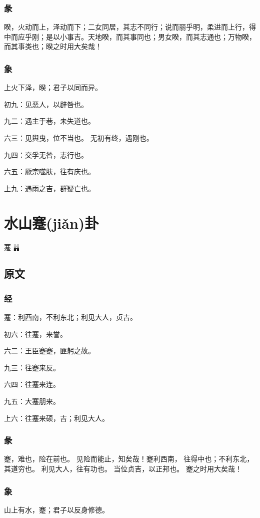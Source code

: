 \documentclass[12pt,oneside]{book}
\begin{document}
\subsection{彖}
睽，火动而上，泽动而下；二女同居，其志不同行；说而丽乎明，柔进而上行，得中而应乎刚；是以小事吉。天地睽，而其事同也；男女睽，而其志通也；万物睽，而其事类也；睽之时用大矣哉！

\subsection{象}
上火下泽，睽；君子以同而异。

初九：见恶人，以辟咎也。

九二：遇主于巷，未失道也。

六三：见舆曳，位不当也。 无初有终，遇刚也。

九四：交孚无咎，志行也。

六五：厥宗噬肤，往有庆也。

上九：遇雨之吉，群疑亡也。


\chapter{水山蹇(jiǎn)卦}
蹇 {\Large ䷦}

\section{原文}

\subsection{经}
蹇：利西南，不利东北；利见大人，贞吉。

初六：往蹇，来誉。

六二：王臣蹇蹇，匪躬之故。

九三：往蹇来反。

六四：往蹇来连。

九五：大蹇朋来。

上六：往蹇来硕，吉；利见大人。

\subsection{彖}
蹇，难也，险在前也。 见险而能止，知矣哉！蹇利西南， 往得中也；不利东北，其道穷也。 利见大人，往有功也。 当位贞吉，以正邦也。 蹇之时用大矣哉！

\subsection{象}
山上有水，蹇；君子以反身修德。
\end{document}
